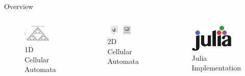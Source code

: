 \begin{frame}{Overview}
    \begin{columns}
        \begin{figure}
            \centering
            \includegraphics[width=0.8\textwidth]{../paper/figures/rule90}
            \caption{1D Cellular Automata}
        \end{figure}
        \begin{figure}
            \centering
            \includegraphics[width=0.8\textwidth]{../paper/figures/spaceship}
            \caption{2D Cellular Automata}
        \end{figure}
        \begin{figure}
            \centering
            \includegraphics[width=0.8\textwidth]{../paper/figures/julia}
            \caption{Julia Implementation\footnotemark}
        \end{figure}
    \end{columns}
\end{frame}


